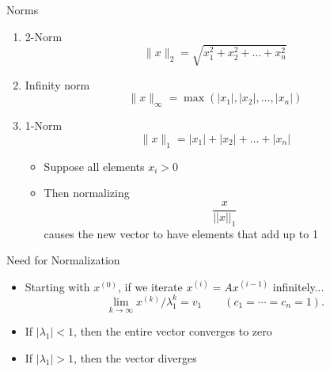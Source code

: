 \documentclass[10pt]{beamer}
\begin{document}
\begin{frame}{Norms}

\begin{enumerate}

    \item 2-Norm 
    $$
    \| x \|_2 = \sqrt{x_1^2 + x_2^2 + \dots + x_n^2}
    $$
    \item Infinity norm
    $$ \| x \|_\infty = \max(|x_1|, |x_2|, \dots, |x_n|) $$

    \item 1-Norm 
    $$ \| x \|_1 = |x_1| + |x_2| + \dots + |x_n| $$
    
    \begin{itemize}
        \item Suppose all elements $x_i>0$ 
        \item Then normalizing  
        $$
            \frac{x}{||x||_1}
        $$
        causes the new vector to have elements that add up to 1
    \end{itemize}
    

\end{enumerate}

\end{frame}
\begin{frame}{Need for Normalization}
\begin{itemize}
    \item Starting with $x^{(0)}$, if we iterate $x^{(i)} = A x^{(i-1)}$ infinitely... 
    \[ \lim_{k\to\infty} x^{(k)}/\lambda_1^k = v_1 \qquad (c_1=\cdots=c_n=1). \]
    \item If $|\lambda_1| < 1$, then the entire vector converges to zero 
    \item If $|\lambda_1| >1$, then the vector diverges
\end{itemize}



\end{frame}
\end{document}
